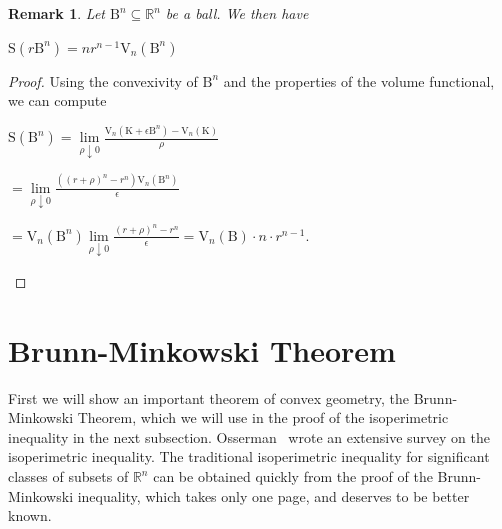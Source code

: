 \documentclass[a4paper]{book}
\newtheorem{remark}[theorem]{Remark}%
\numberwithin{theorem}{section}%
\begin{document}
\begin{remark}
    Let $\mathrm{B}^{n}\subseteq\mathbb{R}^{n}$ be a ball. We then have
    \begin{center}
        $\mathrm{S}(r\mathrm{B}^{n})=nr^{n-1}\mathrm{V}_{n}(\mathrm{B}^{n})$
    \end{center}
\end{remark}
\begin{proof}
    Using the convexivity of $\mathrm{B}^{n}$ and the properties of the volume functional, we can compute
    \begin{center}
        $\displaystyle \mathrm{S}(\mathrm{B}^{n})=\underset{\rho\downarrow0}{\lim}\frac{\mathrm{V}_{n}(\mathrm{K}+\epsilon\mathrm{B}^{n})-\mathrm{V}_{n}(\mathrm{K})}{\rho}$

        $\displaystyle =\underset{\rho\downarrow0}{\lim}\frac{((r+\rho)^{n}-r^{n})\mathrm{V}_{n}(\mathrm{B}^{n})}{\epsilon}$

        $\displaystyle =\mathrm{V}_{n}(\mathrm{B}^{n})\underset{\rho\downarrow0}{\lim}\frac{(r+\rho)^{n}-r^{n}}{\epsilon}=\mathrm{V}_{n}(\mathrm{B})\cdot n\cdot r^{n-1}$.
    \end{center}
\end{proof}

\section{Brunn-Minkowski Theorem}
First we will show an important theorem of convex geometry, the Brunn-Minkowski Theorem, which we will use in the proof of the isoperimetric inequality in the next subsection. Osserman~\citep{osserman1978isoperimetric} wrote an extensive survey on the isoperimetric inequality. The traditional isoperimetric inequality for significant classes of subsets of $\mathbb{R}^{n}$ can be obtained quickly from the proof of the Brunn-Minkowski inequality, which takes only one page, and deserves to be better known.~\citep{gehring2019isoperimetric}
\end{document}
